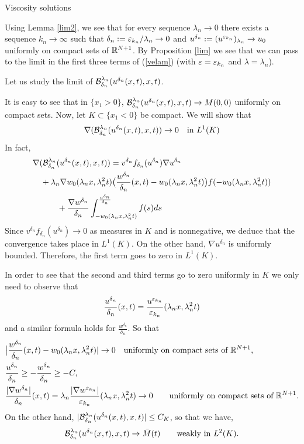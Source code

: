 \begin{section}{Viscosity solutions}
\begin{pf}
Using Lemma \ref{lim2}, we see that for every sequence
$\lambda_n\to0$ there exists a sequence $k_n\to\infty$ such that $\delta_n:=
\varepsilon_{k_n}/\lambda_n\to 0$ and $u^{\delta_n}:=(u^{\varepsilon_{k_n}})_{\lambda_n}\to
u_0$ uniformly on compact sets of ${\Bbb R}^{N+1}$. By Proposition \ref{lim}  
we see that 
we can pass to the limit in the first three terms of (\ref{velam})
(with $\varepsilon=\varepsilon_{k_n}$ and $\lambda=\lambda_n$).
\medskip

Let us study the limit of
${{\cal B}}^{\lambda_n}_{\delta_n}(u^{\delta_n}(x,t), x,t)$.

It is easy to see that in $\{ x_1>0 \}$, 
${{\cal B}}^{\lambda_n}_{\delta_n}(u^{\delta_n}(x,t),x, t)\to M(0,0)$
uniformly on compact sets. Now, let $K\subset\{ x_1<0\}$ be compact. 
We will show that 
$$\nabla({{\cal B}}^{\lambda_n}_{\delta_n}(u^{\delta_n}(x,t), x, t))\to
0\quad \mbox{in } L^1(K)$$
In fact,
\begin{align*}
&\nabla({\cal B}^{\lambda_n}_{\delta_n}(u^{\delta_n}(x,t), x,t))=
v^{\delta_n}f_{\delta_n}(u^{\delta_n})\nabla u^{\delta_n}\\
&\quad+\lambda_n\nabla w_0(\lambda_nx,\lambda_n^2t) \big(\frac{w^{\delta_n}}
{\delta_n}(x,t)-w_0(\lambda_nx,\lambda_n^2t)\big)f(-w_0(\lambda_n x,\lambda_n^2t))\\
&\quad\qquad+\frac{\nabla w^{\delta_n}}{\delta_n}
\int_{-w_0(\lambda_n x,\lambda_n^2t)}
^{\frac{u^{\delta_n}}{\delta_n}}f(s) ds
\end{align*}
Since $v^{\delta_n}f_{\delta_n}(u^{\delta_n})\to 0$ as measures in $K$ and is
nonnegative, we deduce that the convergence takes place in $L^1(K)$. On
the other hand, $\nabla u^{\delta_n}$ is uniformly bounded. Therefore,
the first term goes to zero in $L^1(K)$.

In order to see that the second and third terms go to zero uniformly
in $K$ we only need to observe that
$$
\frac{u^{\delta_n}}{\delta_n}(x,t)=\frac{u^{\varepsilon_{k_n}}}{{\varepsilon_{k_n}}}(\lambda_nx,\lambda_n^2t)
$$
and a similar formula holds for $\frac{w^{\delta_n}}{\delta_n}$. So that
\begin{align*}
&\big|\frac{w^{\delta_n}}{\delta_n}(x,t)-w_0(\lambda_nx,\lambda_n^2t)|\to0
\quad\mbox{uniformly on compact sets of }{\Bbb R}^{N+1},\\
&\frac{u^{\delta_n}}{\delta_n}\ge-\frac{w^{\delta_n}}{\delta_n}\ge-C,\\
&\frac{|\nabla w^{\delta_n}|}{\delta_n}(x,t)=
\lambda_n\frac{|\nabla w^{\varepsilon_{k_n}}|}{{\varepsilon_{k_n}}}(\lambda_nx,\lambda_n^2t)\to
0\qquad\mbox{uniformly on compact sets of }{\Bbb R}^{N+1}. 
\end{align*}
On the other hand,
$|{\cal B}^{\lambda_n}_{\delta_n}(u^{\delta_n}(x,t),x,t)|\le C_K$, 
so that we have, 
$$
{\cal B}^{\lambda_n}_{\delta_n}(u^{\delta_n}(x,t), x, t)\to \bar M(t) 
\qquad\mbox{weakly in }L^2(K).
$$


\end{pf}
\end{section}
